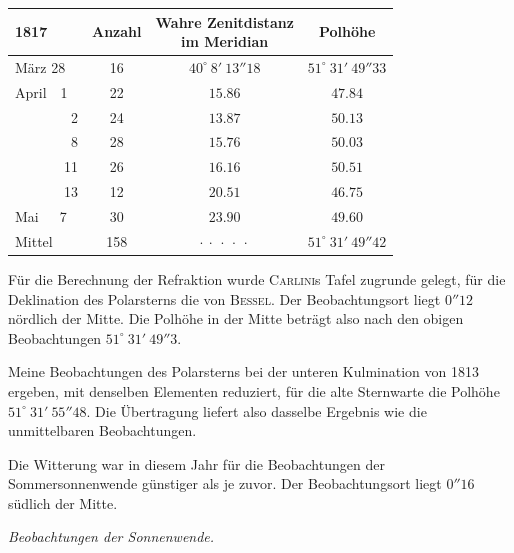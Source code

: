 \begin{center}\fontsize{10}{12}\selectfont\setlength{\tabcolsep}{3pt}
\begin{tabular}{l|c|c|c}
1817 & Anzahl & \shortstack{Wahre Zenitdistanz\\im Meridian} & Polhöhe \\
\hline
März 28 & 16 & $40^\circ\ 8'\ 13''18$ & $51^\circ\ 31'\ 49''33$ \\
April\ \ 1 & 22 & $15.86$ & $47.84$ \\
\ \ \ \ \ \ \ \ 2 & 24 & $13.87$ & $50.13$ \\
\ \ \ \ \ \ \ \ 8 & 28 & $15.76$ & $50.03$ \\
\ \ \ \ \ \ \ 11 & 26 & $16.16$ & $50.51$ \\
\ \ \ \ \ \ \ 13 & 12 & $20.51$ & $46.75$ \\
Mai\ \ \ 7 & 30 & $23.90$ & $49.60$ \\
Mittel & 158 & $\cdot\ \cdot\ \cdot\ \cdot\ \cdot$ & $51^\circ\ 31'\ 49''42$ \\
\end{tabular}
\end{center}

\par\indent Für die Berechnung der Refraktion wurde \textsc{Carlini}s Tafel zugrunde gelegt, für die Deklination des Polarsterns die von \textsc{Bessel}. Der Beobachtungsort liegt $0''12$ nördlich der Mitte. Die Polhöhe in der Mitte beträgt also nach den obigen Beobachtungen $51^\circ\ 31'\ 49''3$.

\par\indent Meine Beobachtungen des Polarsterns bei der unteren Kulmination von 1813 ergeben, mit denselben Elementen reduziert, für die alte Sternwarte die Polhöhe $51^\circ\ 31'\ 55''48$. Die Übertragung liefert also dasselbe Ergebnis wie die unmittelbaren Beobachtungen.

\par\indent Die Witterung war in diesem Jahr für die Beobachtungen der Sommersonnenwende günstiger als je zuvor. Der Beobachtungsort liegt $0''16$ südlich der Mitte.

\par\indent\emph{Beobachtungen der Sonnenwende.}

